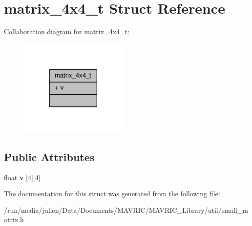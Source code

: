 \hypertarget{structmatrix__4x4__t}{\section{matrix\+\_\+4x4\+\_\+t Struct Reference}
\label{structmatrix__4x4__t}
}


Collaboration diagram for matrix\+\_\+4x4\+\_\+t\+:
\nopagebreak
\begin{figure}[H]
\begin{center}
\leavevmode
\includegraphics[width=153pt]{structmatrix__4x4__t__coll__graph}
\end{center}
\end{figure}
\subsection*{Public Attributes}
\begin{DoxyCompactItemize}
\item 
\hypertarget{structmatrix__4x4__t_a0da88bcdf4ff4f4357796ba305e68cf6}{float {\bfseries v} \mbox{[}4\mbox{]}\mbox{[}4\mbox{]}}\label{structmatrix__4x4__t_a0da88bcdf4ff4f4357796ba305e68cf6}

\end{DoxyCompactItemize}


The documentation for this struct was generated from the following file\+:\begin{DoxyCompactItemize}
\item 
/run/media/julien/\+Data/\+Documents/\+M\+A\+V\+R\+I\+C/\+M\+A\+V\+R\+I\+C\+\_\+\+Library/util/small\+\_\+matrix.\+h\end{DoxyCompactItemize}
